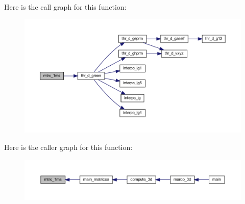 Here is the call graph for this function\+:
\nopagebreak
\begin{figure}[H]
\begin{center}
\leavevmode
\includegraphics[width=350pt]{Marco_8f90_a03907a5d9862c74e1506120651d1848a_cgraph}
\end{center}
\end{figure}
Here is the caller graph for this function\+:
\nopagebreak
\begin{figure}[H]
\begin{center}
\leavevmode
\includegraphics[width=350pt]{Marco_8f90_a03907a5d9862c74e1506120651d1848a_icgraph}
\end{center}
\end{figure}
\mbox{\label{Marco_8f90_a9ccd53c7c6196e0d50a6db7a06d1c4e5}} 
